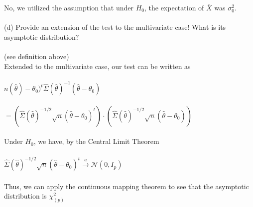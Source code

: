 \documentclass{article}
\begin{document}
No, we utilized the assumption that under $H_0$, the expectation of $\bar{X}$ was $\sigma_0^2$.\\\\
(d) Provide an extension of the test to the multivariate case!  What is its asymptotic distribution?\\\\
(see definition above)\\
Extended to the multivariate case, our test can be written as\\\\
$n(\hat{\theta})-\theta_0)^t\hat{\Sigma}(\hat{\theta})^{-1}(\hat{\theta}-\theta_0)$\\\\
$=(\hat{\Sigma}(\hat{\theta})^{-1/2}\sqrt{n}(\hat{\theta}-\theta_0)^t)\cdot(\hat{\Sigma}(\hat{\theta})^{-1/2}\sqrt{n}(\hat{\theta}-\theta_0))$\\\\
Under $H_0$, we have, by the Central Limit Theorem\\\\ $\hat{\Sigma}(\hat{\theta})^{-1/2}\sqrt{n}(\hat{\theta}-\theta_0)^t\xrightarrow{a}\mathcal{N}(0,I_p)$\\\\
Thus, we can apply the continuous mapping theorem to see that the asymptotic distribution is $\chi_{(p)}^2$
\pagebreak
\end{document}
